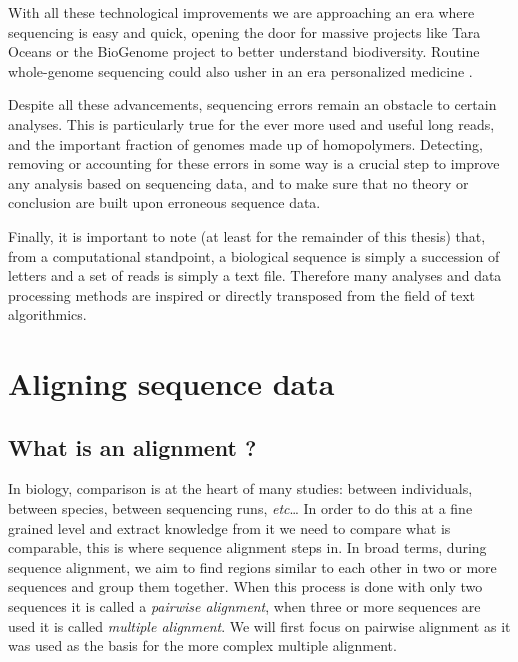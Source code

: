 \documentclass[
  11pt,
  twoside,
  BCOR=10mm,
  listof=totoc]{scrbook}
\begin{document}
With all these technological improvements we are approaching an era where sequencing is easy and quick, opening the door for massive projects like Tara Oceans \autocite{sunagawaTaraOceansGlobal2020} or the BioGenome project \autocite{lewinEarthBioGenomeProject2018} to better understand biodiversity. Routine whole-genome sequencing could also usher in an era personalized medicine \autocite{lightbodyReviewApplicationsHighthroughput2019}.

Despite all these advancements, sequencing errors remain an obstacle to certain analyses. This is particularly true for the ever more used and useful long reads, and the important fraction of genomes made up of homopolymers. Detecting, removing or accounting for these errors in some way is a crucial step to improve any analysis based on sequencing data, and to make sure that no theory or conclusion are built upon erroneous sequence data.

Finally, it is important to note (at least for the remainder of this thesis) that, from a computational standpoint, a biological sequence is simply a succession of letters and a set of reads is simply a text file. Therefore many analyses and data processing methods are inspired or directly transposed from the field of text algorithmics.

\printbibliography[segment=\therefsegment,heading=subbibintoc,title={References for chapter \thechapter}]

\hypertarget{aligning-sequence-data}{%
\chapter{Aligning sequence data}\label{aligning-sequence-data}}

\hypertarget{what-is-an-alignment}{%
\section{What is an alignment ?}\label{what-is-an-alignment}}

In biology, comparison is at the heart of many studies: between individuals, between species, between sequencing runs, \emph{etc}\ldots{} In order to do this at a fine grained level and extract knowledge from it we need to compare what is comparable, this is where sequence alignment steps in. In broad terms, during sequence alignment, we aim to find regions similar to each other in two or more sequences and group them together. When this process is done with only two sequences it is called a \emph{pairwise alignment}, when three or more sequences are used it is called \emph{multiple alignment}. We will first focus on pairwise alignment as it was used as the basis for the more complex multiple alignment.
\end{document}
